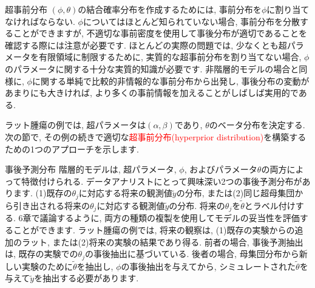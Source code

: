 \documentclass[10pt,dvipdfmx,a4]{beamer}
\newcommand{\tcr}[1]{\textcolor{red}{#1}}
\begin{document}

\begin{frame}{超事前分布}
$(\phi, \theta)$の結合確率分布を作成するためには, 事前分布を$\phi$に割り当てなければならない.
$\phi$についてはほとんど知られていない場合, 事前分布を分散することができますが, 不適切な事前密度を使用して事後分布が適切であることを確認する際には注意が必要です.
ほとんどの実際の問題では, 少なくとも超パラメータを有限領域に制限するために, 実質的な超事前分布を割り当てない場合, $\phi$のパラメータに関する十分な実質的知識が必要です.
非階層的モデルの場合と同様に, $\phi$に関する単純で比較的非情報的な事前分布から出発し, 事後分布の変動があまりにも大きければ, より多くの事前情報を加えることがしばしば実用的である.

ラット腫瘍の例では, 超パラメータは$(\alpha,\beta)$であり, $\theta$のベータ分布を決定する.
次の節で, その例の続きで適切な\tcr{超事前分布(hyperprior distribution)}を構築するための1つのアプローチを示します.
\end{frame}


\begin{frame}{事後予測分布}
階層的モデルは, 超パラメータ, $\phi$, およびパラメータ$\theta$の両方によって特徴付けられる.
データアナリストにとって興味深い2つの事後予測分布があります.
(1)既存の$\theta_j$に対応する将来の観測値$\tilde{y}$の分布, または(2)同じ超母集団から引き出される将来の$\theta_j$に対応する観測値$\tilde{y}$の分布.
将来の$\theta_j$を$\tilde{\theta}$とラベル付けする.
6章で議論するように, 両方の種類の複製を使用してモデルの妥当性を評価することができます.
ラット腫瘍の例では, 将来の観察は, (1)既存の実験からの追加のラット, または(2)将来の実験の結果であり得る.
前者の場合, 事後予測抽出は, 既存の実験での$\theta_j$の事後抽出に基づいている.
後者の場合, 母集団分布から新しい実験のために$\tilde{\theta}$を抽出し, $\phi$の事後抽出を与えてから, シミュレートされた$\tilde{\theta}$を与えて$\tilde{y}$を抽出する必要があります.
\end{frame}

\end{document}
